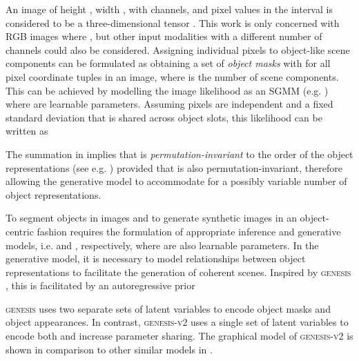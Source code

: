 \documentclass{article}
\begin{document}
An image  of height , width , with  channels, and pixel values in the interval  is considered to be a three-dimensional tensor .
This work is only concerned with RGB images where , but other input modalities with a different number of channels could also be considered.
Assigning individual pixels to object-like scene components can be formulated as obtaining a set of \emph{object masks}  with  for all pixel coordinate tuples  in an image, where  is the number of scene components.
This can be achieved by modelling the image likelihood  as an SGMM (e.g. \cite{greff2016tagger,greff2017neural,van2018relational,burgess2019monet,greff2019multi,kosiorek2019stacked,veerapaneni2020entity,engelcke2020genesis,engelcke2020reconstruction,locatello2020object}) where  are learnable parameters.
Assuming pixels are independent and a fixed standard deviation  that is shared across object slots, this likelihood can be written as

The summation in  implies that  is \emph{permutation-invariant} to the order of the object representations  (see e.g. \cite{zaheer2017deep,wagstaff2019limitations}) provided that  is also permutation-invariant, therefore allowing the generative model to accommodate for a possibly variable number of object representations.

To segment objects in images and to generate synthetic images in an object-centric fashion requires the formulation of appropriate inference and generative models, i.e.  and , respectively, where  are also learnable parameters.
In the generative model, it is necessary to model relationships between object representations to facilitate the generation of coherent scenes.
Inspired by \textsc{genesis} \cite{engelcke2020genesis}, this is facilitated by an autoregressive prior

\textsc{genesis} uses two separate sets of latent variables to encode object masks and object appearances.
In contrast, \textsc{genesis-v2} uses a single set of latent variables  to encode both and increase parameter sharing.
The graphical model of \textsc{genesis-v2} is shown in comparison to other similar models in .
\end{document}
